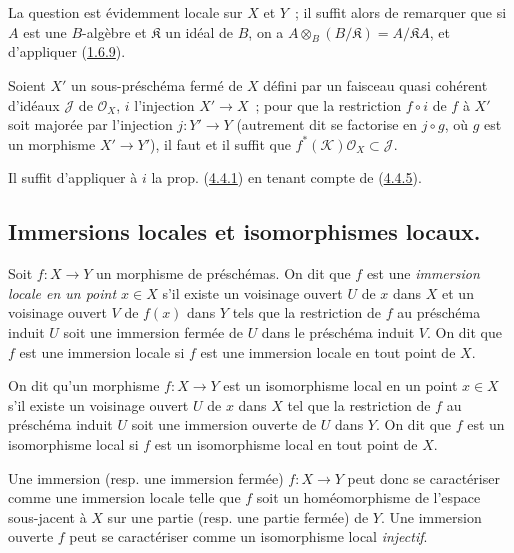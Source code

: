 La question est évidemment locale sur $X$ et $Y$~; il suffit alors de
remarquer que si $A$ est une $B$-algèbre et $\mathfrak{K}$ un idéal de $B$,
on a $A\otimes_B(B/\mathfrak{K})=A/\mathfrak{K}A$, et d'appliquer
(\hyperref[I.1.6.9-fr]{1.6.9}).

\begin{corollary}[4.4.6]
\label{I.4.4.6-fr}
Soient $X'$ un sous-préschéma fermé de $X$ défini par un faisceau quasi
cohérent d'idéaux $\mathscr{J}$ de $\mathscr{O}_X$, $i$ l'injection
$X'\to X$~; pour que la restriction $f\circ i$ de $f$ à $X'$ soit majorée
par l'injection $j:Y'\to Y$ (autrement dit se factorise en $j\circ g$, où
$g$ est un morphisme $X'\to Y'$), il faut et il suffit que
$f^*(\mathscr{K})\mathscr{O}_X\subset\mathscr{J}$.
\end{corollary}

Il suffit d'appliquer à $i$ la prop. (\hyperref[I.4.4.1-fr]{4.4.1}) en
tenant compte de (\hyperref[I.4.4.5-fr]{4.4.5}).

\subsection{Immersions locales et isomorphismes locaux.}
\label{subsection:I.4.5-fr}

\begin{definition}[4.5.1]
\label{I.4.5.1-fr}
Soit $f:X\to Y$ un morphisme de préschémas. On dit que $f$ est une
\emph{immersion locale en un point $x\in X$} s'il existe un voisinage ouvert
$U$ de $x$ dans $X$ et un voisinage ouvert $V$ de $f(x)$ dans $Y$ tels que
la restriction de $f$ au préschéma induit $U$ soit une immersion fermée de
$U$ dans le préschéma induit $V$. On dit que $f$ est une immersion locale si
$f$ est une immersion locale en tout point de $X$.
\end{definition}

\begin{definition}[4.5.2]
\label{I.4.5.2-fr}
On dit qu'un morphisme $f:X\to Y$ est un isomorphisme local en
un point $x\in X$ s'il existe un voisinage ouvert $U$ de $x$ dans $X$ tel
que la restriction de $f$ au préschéma induit $U$ soit une immersion ouverte
de $U$ dans $Y$. On dit que $f$ est un isomorphisme local si $f$ est un
isomorphisme local en tout point de $X$.
\end{definition}

\begin{env}[4.5.3]
\label{I.4.5.3-fr}
Une immersion (resp. une immersion fermée) $f:X\to Y$ peut donc se
caractériser comme une immersion locale telle que $f$ soit un homéomorphisme
de l'espace sous-jacent à $X$ sur une partie (resp. une partie fermée) de
$Y$. Une immersion ouverte $f$ peut se caractériser comme un isomorphisme
local \emph{injectif}.
\end{env}

